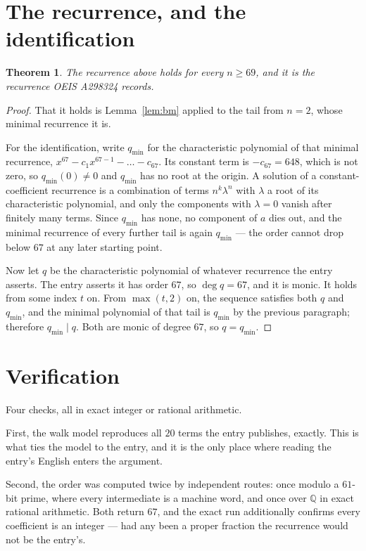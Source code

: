 \documentclass[11pt,a4paper]{article}
\theoremstyle{plain}
\newtheorem{theorem}{Theorem}
\theoremstyle{definition}
\begin{document}
\section{The recurrence, and the identification}

\begin{theorem}
The recurrence above holds for every $n\ge69$, and it is the recurrence OEIS A298324 records.
\end{theorem}

\begin{proof}
That it holds is Lemma~\ref{lem:bm} applied to the tail from $n=2$, whose minimal
recurrence it is.

For the identification, write $q_{\min}$ for the characteristic polynomial of that minimal
recurrence, $x^{67}-c_1x^{67-1}-\dots-c_{67}$. Its constant term is
$-c_{67}=648$, which is not zero, so $q_{\min}(0)\neq0$ and $q_{\min}$ has no
root at the origin. A solution of a constant-coefficient recurrence is a combination of terms
$n^{k}\lambda^{n}$ with $\lambda$ a root of its characteristic polynomial, and only the
components with $\lambda=0$ vanish after finitely many terms. Since $q_{\min}$ has none, no
component of $a$ dies out, and the minimal recurrence of every further tail is again
$q_{\min}$ --- the order cannot drop below $67$ at any later starting point.

Now let $q$ be the characteristic polynomial of whatever recurrence the entry asserts. The
entry asserts it has order $67$, so $\deg q=67$, and it is monic. It holds from some
index $t$ on. From $\max(t,2)$ on, the sequence satisfies both $q$ and $q_{\min}$, and
the minimal polynomial of that tail is $q_{\min}$ by the previous paragraph; therefore
$q_{\min}\mid q$. Both are monic of degree $67$, so $q=q_{\min}$.
\end{proof}

\section{Verification}

Four checks, all in exact integer or rational arithmetic.

First, the walk model reproduces all $20$ terms the entry publishes, exactly. This is
what ties the model to the entry, and it is the only place where reading the entry's English
enters the argument.

Second, the order was computed twice by independent routes: once modulo a $61$-bit prime, where
every intermediate is a machine word, and once over $\mathbb{Q}$ in exact rational arithmetic.
Both return $67$, and the exact run additionally confirms every coefficient is an integer
--- had any been a proper fraction the recurrence would not be the entry's.
\end{document}
